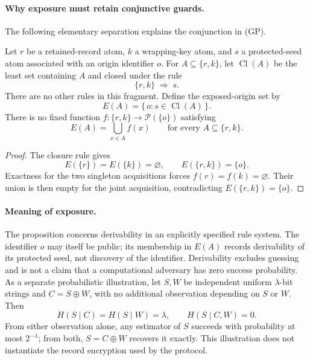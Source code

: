 \paragraph{Why exposure must retain conjunctive guards.}
The following elementary separation explains the conjunction in (GP).

\begin{proposition}
\label{prop:acquisition-nonadditivity}
Let $r$ be a retained-record atom, $k$ a wrapping-key atom, and $s$ a
protected-seed atom associated with an origin identifier $o$.
For $A\subseteq\{r,k\}$, let $\operatorname{Cl}(A)$ be the least set
containing $A$ and closed under the rule
\[
  \{r,k\}\;\Longrightarrow\;s.
\]
There are no other rules in this fragment.  Define the exposed-origin set by
\[
  E(A)=\{\,o : s\in\operatorname{Cl}(A)\,\}.
\]
There is no fixed function
$f:\{r,k\}\longrightarrow\mathcal{P}(\{o\})$ satisfying
\[
  E(A)=\bigcup_{x\in A} f(x)
  \qquad\text{for every }A\subseteq\{r,k\}.
\]
\end{proposition}

\begin{proof}
The closure rule gives
\[
  E(\{r\})=E(\{k\})=\varnothing,
  \qquad
  E(\{r,k\})=\{o\}.
\]
Exactness for the two singleton acquisitions forces
$f(r)=f(k)=\varnothing$.  Their union is then empty for the joint
acquisition, contradicting $E(\{r,k\})=\{o\}$.
\end{proof}

\paragraph{Meaning of exposure.}
The proposition concerns derivability in an explicitly specified rule
system.  The identifier $o$ may itself be public; its membership in $E(A)$
records derivability of its protected seed, not discovery of the identifier.
Derivability excludes guessing and is not a claim that a computational
adversary has zero success probability.  As a separate probabilistic
illustration, let $S,W$ be independent uniform $\lambda$-bit strings and
$C=S\mathbin{\oplus}W$, with no additional observation depending on $S$ or
$W$.  Then
\[
  H(S\mid C)=H(S\mid W)=\lambda,
  \qquad H(S\mid C,W)=0.
\]
From either observation alone, any estimator of $S$ succeeds with
probability at most $2^{-\lambda}$; from both, $S=C\mathbin{\oplus}W$
recovers it exactly.  This illustration does not instantiate the record
encryption used by the protocol.


